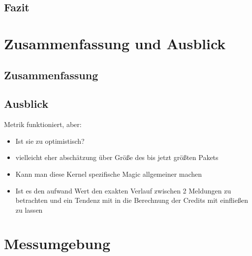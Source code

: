 \documentclass[a4paper, 12pt, BCOR10mm, DIV12, toc=bibliography, toc=listof, german]{scrbook}
\begin{document}

		\section{Fazit} %
		\label{sec:messungen-fazit}
		


	\chapter{Zusammenfassung und Ausblick} %
	\label{cha:zusammenfassung}

		\section{Zusammenfassung} %
		\label{sec:zusammenfassung}
			

		\section{Ausblick} %
		\label{sec:ausblick}

		Metrik funktioniert, aber:
		\begin{itemize}
			\item Ist sie zu optimistisch?
			\item vielleicht eher abschätzung über Größe des bis jetzt größten Pakets
			\item Kann man diese Kernel spezifische Magic allgemeiner machen
			\item Ist es den aufwand Wert den exakten Verlauf zwischen 2 Meldungen zu betrachten und ein
				Tendenz mit in die Berechnung der Credits mit einfließen zu lassen
		\end{itemize}
		



	\appendix

	\chapter{Messumgebung} %
	\label{cha:messumgebung}

	
\end{document}
